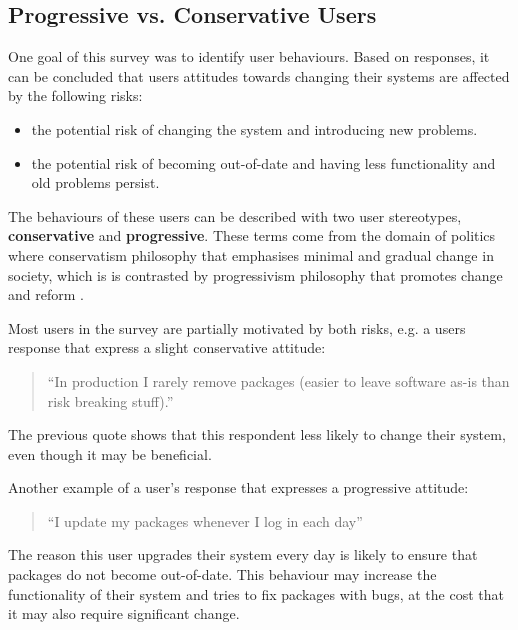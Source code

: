 \subsection{Progressive vs. Conservative Users}
One goal of this survey was to identify user behaviours.
Based on responses, it can be concluded that users attitudes towards changing their systems are affected by the following risks:
\begin{itemize}
  \item the potential risk of changing the system and introducing new problems.
  \item the potential risk of becoming out-of-date and having less functionality and old problems persist.
\end{itemize}
The behaviours of these users can be described with two user stereotypes, \textbf{conservative} and \textbf{progressive}.
These terms come from the domain of politics where conservatism philosophy that emphasises minimal and gradual change in society,
which is is contrasted by progressivism philosophy that promotes change and reform \citep{oed2010}.

Most users in the survey are partially motivated by both risks, e.g. a users response that express a slight conservative attitude:
\begin{quotation}
``In production I rarely remove packages (easier to leave software as-is than risk breaking stuff).''
\end{quotation}
The previous quote shows that this respondent less likely to change their system, even though it may be beneficial. 

Another example of a user's response that expresses a progressive attitude:
\begin{quotation}
``I update my packages whenever I log in each day''
\end{quotation}
The reason this user upgrades their system every day is likely to ensure that packages do not become out-of-date.
This behaviour may increase the functionality of their system and tries to fix packages with bugs, at the cost that it may also require significant change.


